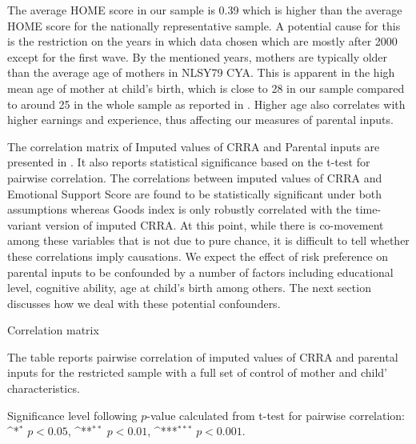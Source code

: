 \documentclass[]{article}
\begin{document}
The average HOME score in our sample is 0.39 which is higher than the average HOME score for the nationally representative sample. A potential cause for this is the restriction on the years in which data chosen which are mostly after 2000 except for the first wave. By the mentioned years, mothers are typically older than the average age of mothers in NLSY79 CYA. This is apparent in the high mean age of mother at child's birth, which is close to 28 in our sample compared to around 25 in the whole sample as reported in \citet{carneiro2016partial}. Higher age also correlates with higher earnings and experience, thus affecting our measures of parental inputs. 

The correlation matrix of Imputed values of CRRA and Parental inputs are presented in . It also reports statistical significance based on the t-test for pairwise correlation. The correlations between imputed values of CRRA and Emotional Support Score are found to be statistically significant under both assumptions whereas Goods index is only robustly correlated with the time-variant version of imputed CRRA. At this point, while there is co-movement among these variables that is not due to pure chance, it is difficult to tell whether these correlations imply causations. We expect the effect of risk preference on parental inputs to be confounded by a number of factors including educational level, cognitive ability, age at child's birth among others. The next section discusses how we deal with these potential confounders.   

\begin{sidewaystable}[!htbp]
	\def\sym#1{\ifmmode^{#1}\else\(^{#1}\)\fi}
	\setlength{\extrarowheight}{0.3em}
	\begin{threeparttable}
		\caption{Correlation matrix}
		
		\begin{tablenotes}[flushleft]\footnotesize
			\item The table reports pairwise correlation of imputed values of CRRA and parental inputs for the restricted sample with a full set of control of mother and child' characteristics.
			\item Significance level following $p$-value calculated from t-test for pairwise correlation: \sym{*} \(p<0.05\), \sym{**} \(p<0.01\), \sym{***} \(p<0.001\).  
		\end{tablenotes}
		\label{table:correlation-matrix}
	\end{threeparttable}
\end{sidewaystable}
\end{document}
